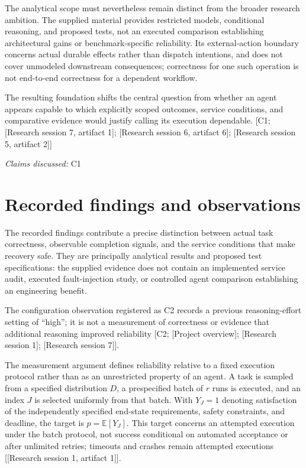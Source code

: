 \documentclass[11pt]{article}
\begin{document}
The analytical scope must nevertheless remain distinct from the broader research ambition. The supplied material provides restricted models, conditional reasoning, and proposed tests, not an executed comparison establishing architectural gains or benchmark-specific reliability. Its external-action boundary concerns actual durable effects rather than dispatch intentions, and does not cover unmodeled downstream consequences; correctness for one such operation is not end-to-end correctness for a dependent workflow.

The resulting foundation shifts the central question from whether an agent appears capable to which explicitly scoped outcomes, service conditions, and comparative evidence would justify calling its execution dependable. [C1; [Research session 7, artifact 1]; [Research session 6, artifact 6]; [Research session 5, artifact 2]]

\textit{Claims discussed: }C1
\section{Recorded findings and observations}
The recorded findings contribute a precise distinction between actual task correctness, observable completion signals, and the service conditions that make recovery safe. They are principally analytical results and proposed test specifications: the supplied evidence does not contain an implemented service audit, executed fault-injection study, or controlled agent comparison establishing an engineering benefit.

The configuration observation registered as C2 records a previous reasoning-effort setting of \textquotedblleft{}high\textquotedblright{}; it is not a measurement of correctness or evidence that additional reasoning improved reliability [C2; [Project overview]; [Research session 1]; [Research session 7]].

The measurement argument defines reliability relative to a fixed execution protocol rather than as an unrestricted property of an agent. A task is sampled from a specified distribution $D$, a prespecified batch of $r$ runs is executed, and an index $J$ is selected uniformly from that batch. With $Y_J=1$ denoting satisfaction of the independently specified end-state requirements, safety constraints, and deadline, the target is $p=\mathbb{E}[Y_J]$. This target concerns an attempted execution under the batch protocol, not success conditional on automated acceptance or after unlimited retries; timeouts and crashes remain attempted executions [[Research session 1, artifact 1]].
\end{document}
